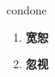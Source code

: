 
\begin{frame}
{\huge condone}
\begin{center}
\begin{enumerate}\Large
  \item \textbf{宽恕}
  \item \textbf{忽视}
\end{enumerate}
\end{center}
\end{frame}

